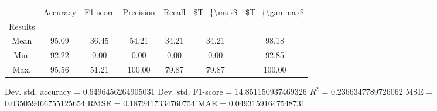 \begin{tabular}{|c|c|c|c|c|c|c|}
\toprule
{} &  Accuracy &  F1 score &  Precision &  Recall &  \$T\_\{\textbackslash mu\}\$ &  \$T\_\{\textbackslash gamma\}\$ \\
Results &           &           &            &         &            &               \\
\hline
Mean    &     95.09 &     36.45 &      54.21 &   34.21 &      34.21 &         98.18 \\
Min.    &     92.22 &      0.00 &       0.00 &    0.00 &       0.00 &         92.85 \\
Max.    &     95.56 &     51.21 &     100.00 &   79.87 &      79.87 &        100.00 \\
\bottomrule
\end{tabular}

 Dev. std. accuracy = 0.6496456264905031
 Dev. std. F1-score = 14.851150937469326
 $R^2$ = 0.2366347789726062
 MSE = 0.035059466755125654
 RMSE = 0.1872417334760754
 MAE = 0.04931591647548731